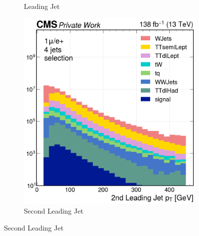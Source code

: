 \begin{figure}[H]
\begin{subfigure}{0.42\linewidth}
         \caption{Leading Jet}
     \end{subfigure}
    \begin{subfigure}{0.42\linewidth}
        \includegraphics[width=\linewidth]{fig//chap07-selection/selection/Second_Leading_Jet_pt.png}
         \caption{Second Leading Jet}
     \end{subfigure}
\end{figure}
\vspace{-0.5cm}
